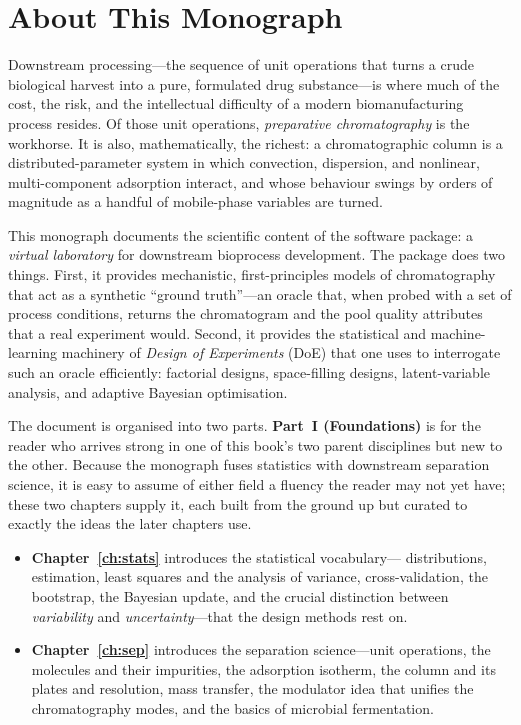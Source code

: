 \chapter*{About This Monograph}

Downstream processing---the sequence of unit operations that turns a crude
biological harvest into a pure, formulated drug substance---is where much of the
cost, the risk, and the intellectual difficulty of a modern biomanufacturing
process resides. Of those unit operations, \emph{preparative chromatography} is
the workhorse. It is also, mathematically, the richest: a chromatographic column
is a distributed-parameter system in which convection, dispersion, and
nonlinear, multi-component adsorption interact, and whose behaviour swings by
orders of magnitude as a handful of mobile-phase variables are turned.

This monograph documents the scientific content of the 
software package: a \emph{virtual laboratory} for downstream bioprocess
development. The package does two things. First, it provides mechanistic,
first-principles models of chromatography that act as a synthetic ``ground
truth''---an oracle that, when probed with a set of process conditions, returns
the chromatogram and the pool quality attributes that a real experiment would.
Second, it provides the statistical and machine-learning machinery of
\emph{Design of Experiments} (DoE) that one uses to interrogate such an oracle
efficiently: factorial designs, space-filling designs, latent-variable analysis,
and adaptive Bayesian optimisation.

The document is organised into two parts. \textbf{Part~I (Foundations)} is for the
reader who arrives strong in one of this book's two parent disciplines but new to
the other. Because the monograph fuses statistics with downstream separation
science, it is easy to assume of either field a fluency the reader may not yet
have; these two chapters supply it, each built from the ground up but curated to
exactly the ideas the later chapters use.

\begin{itemize}
  \item \textbf{Chapter~\ref{ch:stats}} introduces the statistical vocabulary---
  distributions, estimation, least squares and the analysis of variance,
  cross-validation, the bootstrap, the Bayesian update, and the crucial
  distinction between \emph{variability} and \emph{uncertainty}---that the design
  methods rest on.

  \item \textbf{Chapter~\ref{ch:sep}} introduces the separation science---unit
  operations, the molecules and their impurities, the adsorption isotherm, the
  column and its plates and resolution, mass transfer, the modulator idea that
  unifies the chromatography modes, and the basics of microbial fermentation.
\end{itemize}

